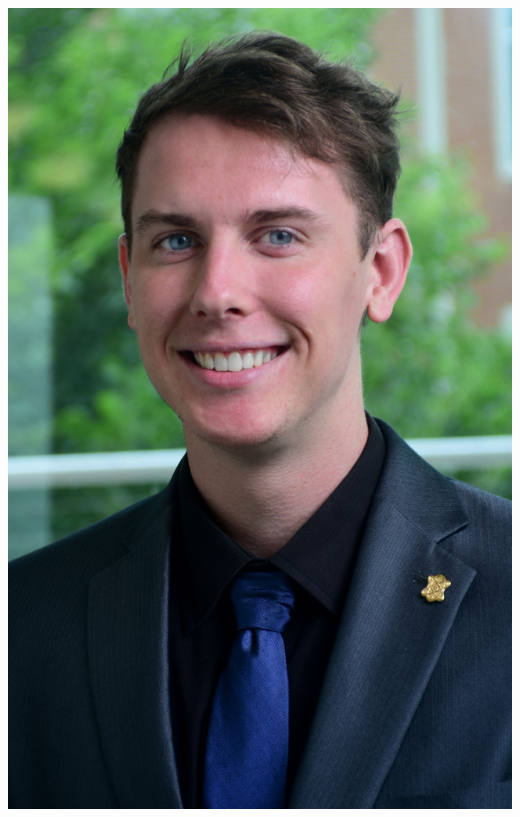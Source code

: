 \begin{minipage}{0.25\textwidth}
	\centering
	\includegraphics[width=\textwidth]{ncreid2.jpg}
\end{minipage}

